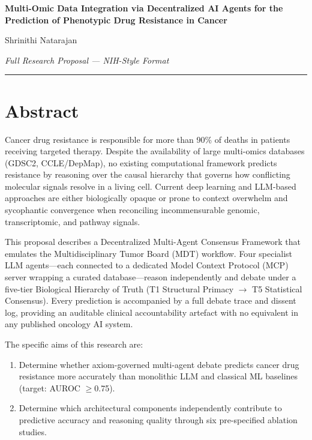 \documentclass[11pt,letterpaper]{article}
\begin{document}
\begin{center}
{\large\bfseries Multi-Omic Data Integration via Decentralized AI Agents for the\\
Prediction of Phenotypic Drug Resistance in Cancer}

\vspace{0.5em}
Shrinithi Natarajan

\vspace{0.5em}
\textit{Full Research Proposal --- NIH-Style Format}
\end{center}

\vspace{1em}
\hrule
\vspace{1em}

\section*{Abstract}

Cancer drug resistance is responsible for more than 90\% of deaths in patients receiving
targeted therapy. Despite the availability of large multi-omics databases (GDSC2, CCLE/DepMap),
no existing computational framework predicts resistance by reasoning over the causal hierarchy
that governs how conflicting molecular signals resolve in a living cell. Current deep learning
and LLM-based approaches are either biologically opaque or prone to context overwhelm and
sycophantic convergence when reconciling incommensurable genomic, transcriptomic, and
pathway signals.

This proposal describes a Decentralized Multi-Agent Consensus Framework that emulates the
Multidisciplinary Tumor Board (MDT) workflow. Four specialist LLM agents---each connected to
a dedicated Model Context Protocol (MCP) server wrapping a curated database---reason
independently and debate under a five-tier Biological Hierarchy of Truth (T1 Structural
Primacy $\to$ T5 Statistical Consensus). Every prediction is accompanied by a full debate trace
and dissent log, providing an auditable clinical accountability artefact with no equivalent in
any published oncology AI system.

The specific aims of this research are:
\begin{enumerate}
  \item Determine whether axiom-governed multi-agent debate predicts cancer drug resistance
        more accurately than monolithic LLM and classical ML baselines (target: AUROC $\geq$0.75).
  \item Determine which architectural components independently contribute to predictive
        accuracy and reasoning quality through six pre-specified ablation studies.
\end{enumerate}
\end{document}
